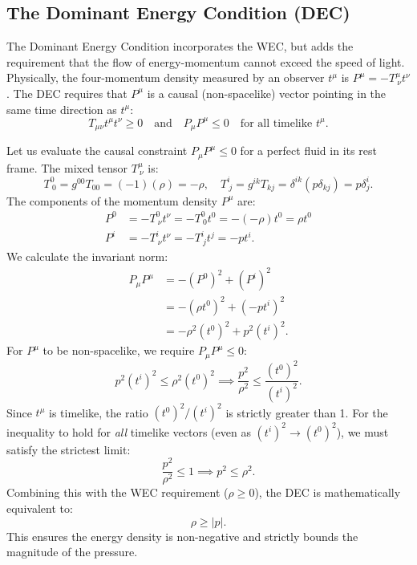 \documentclass[11pt, a4paper]{report}
\begin{document}
\subsection{The Dominant Energy Condition (DEC)}

The Dominant Energy Condition incorporates the WEC, but adds the requirement that the flow of energy-momentum cannot exceed the speed of light. Physically, the four-momentum density measured by an observer $t^{\mu}$ is $P^{\mu} = -T^{\mu}_{\ \nu}t^{\nu}$. The DEC requires that $P^{\mu}$ is a causal (non-spacelike) vector pointing in the same time direction as $t^{\mu}$:
\begin{equation}
T_{\mu\nu} t^{\mu} t^{\nu} \ge 0 \quad \text{and} \quad P_{\mu}P^{\mu} \le 0 \quad \text{for all timelike } t^{\mu}.
\end{equation}

Let us evaluate the causal constraint $P_{\mu}P^{\mu} \le 0$ for a perfect fluid in its rest frame. The mixed tensor $T^{\mu}_{\ \nu}$ is:
\begin{equation}
T^{0}_{\ 0} = g^{00}T_{00} = (-1)(\rho) = -\rho, \quad T^{i}_{\ j} = g^{ik}T_{kj} = \delta^{ik}(p \delta_{kj}) = p \delta^{i}_{j}.
\end{equation}
The components of the momentum density $P^{\mu}$ are:
\begin{align}
P^{0} &= -T^{0}_{\ \nu} t^{\nu} = -T^{0}_{\ 0} t^{0} = -(-\rho)t^{0} = \rho t^{0} \\
P^{i} &= -T^{i}_{\ \nu} t^{\nu} = -T^{i}_{\ j} t^{j} = -p t^{i}.
\end{align}
We calculate the invariant norm:
\begin{align}
P_{\mu}P^{\mu} &= -(P^{0})^{2} + (P^{i})^{2} \nonumber \\
&= -(\rho t^{0})^{2} + (-p t^{i})^{2} \nonumber \\
&= -\rho^{2}(t^{0})^{2} + p^{2}(t^{i})^{2}.
\end{align}
For $P^{\mu}$ to be non-spacelike, we require $P_{\mu}P^{\mu} \le 0$:
\begin{equation}
p^{2}(t^{i})^{2} \le \rho^{2}(t^{0})^{2} \implies \frac{p^{2}}{\rho^{2}} \le \frac{(t^{0})^{2}}{(t^{i})^{2}}.
\end{equation}
Since $t^{\mu}$ is timelike, the ratio $(t^{0})^{2}/(t^{i})^{2}$ is strictly greater than 1. For the inequality to hold for \textit{all} timelike vectors (even as $(t^{i})^{2} \to (t^{0})^{2}$), we must satisfy the strictest limit:
\begin{equation}
\frac{p^{2}}{\rho^{2}} \le 1 \implies p^{2} \le \rho^{2}.
\end{equation}
Combining this with the WEC requirement ($\rho \ge 0$), the DEC is mathematically equivalent to:
\begin{equation}
\rho \ge |p|.
\end{equation}
This ensures the energy density is non-negative and strictly bounds the magnitude of the pressure.
\end{document}
